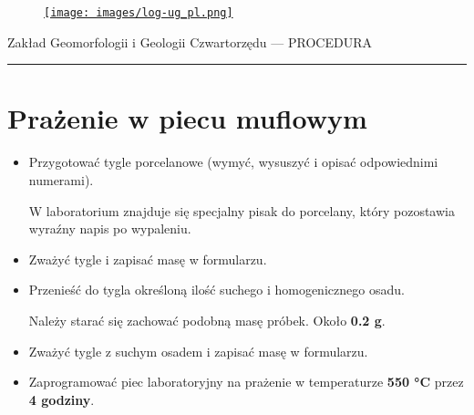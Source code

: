 \documentclass[
  letterpaper,
  DIV=11,
  numbers=noendperiod]{scrreprt}
\begin{document}
\begin{figure}

\href{https://geomorfologia.ug.edu.pl}{\texttt{[image: images/log-ug\_pl.png]}}

\end{figure}

Zakład Geomorfologii i Geologii Czwartorzędu --- PROCEDURA

\begin{center}\rule{0.5\linewidth}{0.5pt}\end{center}

\hypertarget{praux17cenie-w-piecu-muflowym}{%
\section{Prażenie w piecu
muflowym}\label{praux17cenie-w-piecu-muflowym}}

\begin{itemize}
\item
  Przygotować tygle porcelanowe (wymyć, wysuszyć i opisać odpowiednimi
  numerami).

  W laboratorium znajduje się specjalny pisak do porcelany, który
  pozostawia wyraźny napis po wypaleniu.
\item
  Zważyć tygle i zapisać masę w formularzu.
\item
  Przenieść do tygla określoną ilość suchego i homogenicznego osadu.

  Należy starać się zachować podobną masę próbek. Około \textbf{0.2 g}.
\item
  Zważyć tygle z suchym osadem i zapisać masę w formularzu.
\item
  Zaprogramować piec laboratoryjny na prażenie w temperaturze
  \textbf{550 °C} przez \textbf{4 godziny}.
\end{itemize}
\end{document}
